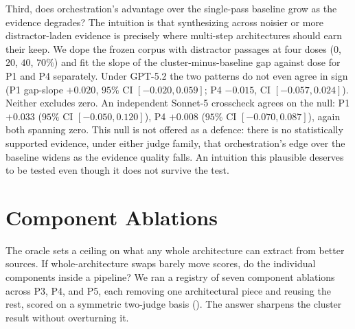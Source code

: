 \documentclass[11pt]{article}
\begin{document}
Third, does orchestration's advantage over the single-pass baseline grow as the evidence
degrades? The intuition is that synthesizing across noisier or more distractor-laden
evidence is precisely where multi-step architectures should earn their keep. We dope the
frozen corpus with distractor passages at four doses ($0$, $20$, $40$, $70\%$) and fit the
slope of the cluster-minus-baseline gap against dose for P1 and P4 separately. Under GPT-5.2
the two patterns do not even agree in sign (P1 gap-slope $+0.020$, $95\%$ CI
$[-0.020, 0.059]$; P4 $-0.015$, CI $[-0.057, 0.024]$). Neither excludes zero. An
independent Sonnet-5 crosscheck agrees on the null: P1 $+0.033$ ($95\%$ CI
$[-0.050, 0.120]$), P4 $+0.008$ ($95\%$ CI $[-0.070, 0.087]$), again both spanning zero. This
null is not offered as a defence: there is no statistically
supported evidence, under either judge family, that orchestration's edge over the baseline
widens as the evidence quality falls. An intuition this plausible deserves to be tested even
though it does not survive the test.
\FloatBarrier
\section{Component Ablations}\label{sec:ablations}

The oracle sets a ceiling on what any whole architecture can extract from better sources.
If whole-architecture swaps barely move scores, do the individual components inside a
pipeline? We ran a registry of seven component ablations across P3, P4, and P5, each
removing one architectural piece and reusing the rest, scored on a symmetric two-judge
basis (). The answer sharpens the
cluster result without overturning it.
\end{document}
